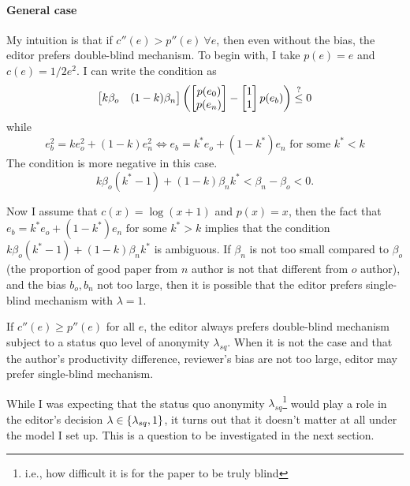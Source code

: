 \documentclass[12pt]{article}
\begin{document}
\paragraph{General case} My intuition is that if $c''(e)>p''(e) \ \forall e$, then even without the
bias, the editor prefers double-blind mechanism. To begin with, I take $p(e)=e$
and $c(e)=1/2e^2$. I can write the condition as
\begin{equation*}
    \begin{bmatrix}
        k\beta_o & (1-k)\beta_n
    \end{bmatrix}
    \left(
        \begin{bmatrix}
            p(e_0) \\ p(e_n)
        \end{bmatrix}
        -
        \begin{bmatrix}
            1 \\ 1
        \end{bmatrix}
        p(e_b)\right)
    \stackrel{?}{\leq} 0
\end{equation*}
while
\[e_b^2 = k e_o^2 + (1-k)e_n^2 \Leftrightarrow e_b = k^* e_o + (1-k^*)e_n \text{ for some } k^*<k\]
The condition is more negative in this case.
\begin{equation*}
    k\beta_o (k^*-1)+(1-k)\beta_n k^* < \beta_n-\beta_o< 0.
\end{equation*}

Now I assume that $c(x)=\log(x+1)$ and $p(x)=x$, then the fact that $e_b = k^*
    e_o + (1-k^*)e_n \text{ for some } k^*>k$ implies that the condition $k\beta_o
    (k^*-1)+(1-k)\beta_n k^*$ is ambiguous. If $\beta_n$ is not too small compared
to $\beta_o$ (the proportion of good paper from $n$ author is not that
different from $o$ author), and the bias $b_o, b_n$ not too large, then it is
possible that the editor prefers single-blind mechanism with $\lambda=1$.
\begin{proposition}
    If $c''(e)\ge p''(e)$ for all $e$, the editor always prefers double-blind mechanism subject to a status quo level of anonymity $\lambda_{sq}$. When it is not the case and that the author's productivity difference, reviewer's bias are not too large, editor may prefer single-blind mechanism.
\end{proposition}

While I was expecting that the status quo anonymity
$\lambda_{sq}$\footnote{i.e., how difficult it is for the paper to be truly
    blind} would play a role in the editor's decision $\lambda \in
    \left\{\lambda_{sq},1\right\}$, it turns out that it doesn't matter at all under the
model I set up. This is a question to be investigated in the next section.
\end{document}
